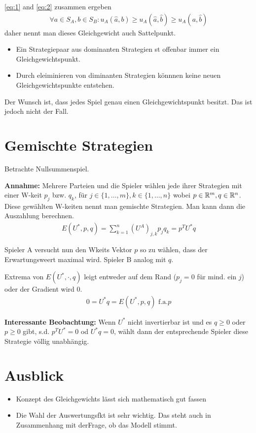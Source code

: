 \eqref{eq:1} and \eqref{eq:2} zusammen ergeben 
\begin{align*}
	\forall a \in S_A, b \in S_B: u_A(\hat{a},b) \geq u_A(\hat{a}, \hat{b}) \geq u_A(a, \hat{b})
\end{align*}
daher nennt man dieses Gleichgewicht auch Sattelpunkt. 

\begin{rem}
	\begin{itemize}
		\item Ein Strategiepaar aus dominanten Strategien st offenbar immer ein Gleichgewichtspunkt.
		\item Durch eleiminieren von diminanten Strategien könnnen keine neuen Gleichgewichtspunkte entstehen.  
	\end{itemize}
\end{rem}

Der Wunsch ist, dass jedes Spiel genau einen Gleichgewichtspunkt besitzt. Das ist jedoch nicht der Fall. 

\section{Gemischte Strategien}
Betrachte Nullsummenspiel. 

\textbf{Annahme:} Mehrere Parteien und die Spieler wählen jede ihrer Strategien mit einer W-keit $p_j$ bzw. $q_k$, für $j \in \{1, \dots, m\}, k \in \{1, \dots, n\}$ wobei $p \in \mathbb{R}^m, q \in \mathbb{R}^n$. Diese gewählten W-keiten nennt man gemischte Strategien. Man kann dann die Auszahlung berechnen. 
\begin{align*}
	E(U^*, p, q)= \sum\limits_{k=1}^n (U^A)_{j,k} p_j q_k = p^T U^*q
\end{align*}

Spieler A versucht nun den Wkeits Vektor $p$ so zu wählen, dass der Erwartungsweert maximal wird. Spieler B analog mit $q$. 

Extrema von $E(U^*,\cdot, q)$ leigt entweder auf dem Rand ($p_j=0$ für mind. ein $j$) oder der Gradient wird 0. 
\begin{align*}
	0= U^* q = E(U^*,p,q) \text{ f.a.} p
\end{align*}

\textbf{Interessante Beobachtung:} Wenn $U^*$ nicht invertierbar ist und es $q \geq 0$ oder $p \geq 0$ gibt, s.d. $p^T U^*=0$ od $U^*q=0$, wählt dann der entsprechende Spieler diese Strategie völlig unabhängig. 

\section{Ausblick}
\begin{itemize}
	\item Konzept des Gleichgewichts lässt sich mathematisch gut fassen
	\item Die Wahl der Auswertungsfkt ist sehr wichtig. Das steht auch in Zusammenhang mit derFrage, ob das Modell stimmt. 
\end{itemize}




















